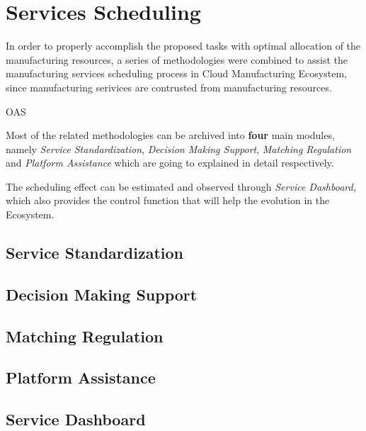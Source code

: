 \section{Services Scheduling} %
\label{sec:schedule}

In order to properly accomplish the proposed tasks with optimal allocation of the manufacturing resources, a series of methodologies were combined to assist the manufacturing services scheduling process in Cloud Manufacturing Ecosystem, since manufacturing serivices are contrusted from manufacturing resources. 

OAS  

Most of the related methodologies can be archived into \textbf{four} main modules, namely \textit{Service Standardization}, \textit{Decision Making Support}, \textit{Matching Regulation} and \textit{Platform Assistance} which are going to explained in detail respectively.

The scheduling effect can be estimated and observed through \textit{Service Dashboard}, which also provides the control function that will help the evolution in the Ecosystem.

\subsection{Service Standardization} %
\label{sub:service_standardization}


\subsection{Decision Making Support} %
\label{sub:decision_making_support}


\subsection{Matching Regulation} %
\label{sub:matching_regulation}


\subsection{Platform Assistance} %
\label{sub:platform_assistance}


\subsection{Service Dashboard} %
\label{sub:service_dashboard}

